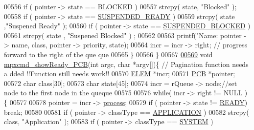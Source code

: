 \begin{DoxyCode}
{{00556                 \textcolor{keywordflow}{if} ( pointer -> state == \hyperlink{mpx__r2_8h_a48f6457243719e7031768d4100741159}{BLOCKED} ) 
00557                         strcpy( state, \textcolor{stringliteral}{"Blocked"} );
00558                 \textcolor{keywordflow}{if} ( pointer -> state == \hyperlink{mpx__r2_8h_a07b1141143e8825b04670da23fca8cc7}{SUSPENDED_READY} ) 
00559                         strcpy( state ,\textcolor{stringliteral}{"Suspened Ready"} );
00560                 \textcolor{keywordflow}{if} ( pointer -> state == \hyperlink{mpx__r2_8h_a6e41bb5a80c5049e8d364bab8ee4d73a}{SUSPENDED_BLOCKED} ) 
00561                         strcpy( state , \textcolor{stringliteral}{"Suspened Blocked"} ) ;
00562                 
00563                 printf(\textcolor{stringliteral}{"Name: %
      pointer -> name, \textcolor{keyword}{class}, pointer -> priority, state); 
00564                 incr = incr -> right; \textcolor{comment}{// progress forward to the right of the que
      que}
00565         \}
00566 \}
00567 
\hypertarget{mpx__r2_8c_source_l00569}{}\hyperlink{mpx__r2_8h_aeaac6d37294f767e31c3789971c5ecd4}{00569} \textcolor{keywordtype}{void} \hyperlink{mpx__r2_8c_aeaac6d37294f767e31c3789971c5ecd4}{mpxcmd_showReady_PCB}(\textcolor{keywordtype}{int} argc, \textcolor{keywordtype}{char} *argv[])\{ \textcolor{comment}{// Pagination function needs a
      dded !!Function still needs work!!}
00570         \hyperlink{structpage}{ELEM} *incr;
00571         \hyperlink{structprocess}{PCB} *pointer;
00572         \textcolor{keywordtype}{char} \textcolor{keyword}{class}[30];
00573         \textcolor{keywordtype}{char} state[45];
00574         incr = rQueue -> node;\textcolor{comment}{//set node to the first node in the queque}
00575         
00576         \textcolor{keywordflow}{while}( incr -> right != NULL )\{
00577                 
00578                 pointer = incr -> \hyperlink{structprocess}{process};
00579                 \textcolor{keywordflow}{if} ( pointer -> state != \hyperlink{mpx__r2_8h_ad1235d5ce36f7267285e82dccd428aa6}{READY}) \textcolor{keywordflow}{break};
00580                 
00581                 \textcolor{keywordflow}{if} ( pointer -> classType  == \hyperlink{mpx__r2_8h_a796bd7c6ba2e59281760fb155c6287e8}{APPLICATION} )
00582                         strcpy( \textcolor{keyword}{class}, \textcolor{stringliteral}{"Application"} );
00583                 \textcolor{keywordflow}{if} (  pointer -> classType == \hyperlink{mpx__r2_8h_a21b97df85e65556468b28a576311271c}{SYSTEM} )
}}}
\end{DoxyCode}
